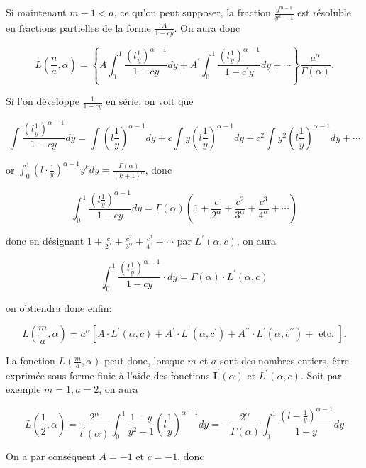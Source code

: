 \documentclass{article}
\begin{document}
Si maintenant \(m-1<a\), ce qu'on peut supposer, la fraction \(\frac{y^{m-1}}{y^{a}-1}\) est résoluble en fractions partielles de la forme \(\frac{A}{1-c y}\). On aura donc

\[
L\left(\frac{n}{a}, \alpha\right)=\left\{A \int_{0}^{1} \frac{\left(l \frac{1}{y}\right)^{\alpha-1}}{1-c y} d y+A^{\prime} \int_{0}^{1} \frac{\left(l \frac{1}{y}\right)^{\alpha-1}}{1-c^{\prime} y} d y+\cdots\right\} \frac{a^{\alpha}}{\Gamma(\alpha)} .
\]

Si l'on développe \(\frac{1}{1-c y}\) en série, on voit que

\[
\int \frac{\left(l \frac{1}{y}\right)^{\alpha-1}}{1-c y} d y=\int\left(l \frac{1}{y}\right)^{\alpha-1} d y+c \int y\left(l \frac{1}{y}\right)^{\alpha-1} d y+c^{2} \int y^{2}\left(l \frac{1}{y}\right)^{\alpha-1} d y+\cdots
\]

or \(\int_{0}^{1}\left(l \cdot \frac{1}{y}\right)^{\alpha-1} y^{k} d y=\frac{\Gamma(\alpha)}{(k+1)^{\alpha}}\), donc

\[
\int_{0}^{1} \frac{\left(l \frac{1}{y}\right)^{\alpha-1}}{1-c y} d y=\Gamma(\alpha)\left(1+\frac{c}{2^{\alpha}}+\frac{c^{2}}{3^{\alpha}}+\frac{c^{3}}{4^{\alpha}}+\cdots\right)
\]

donc en désignant \(1+\frac{c}{2^{\alpha}}+\frac{c^{2}}{3^{\alpha}}+\frac{c^{3}}{4^{\alpha}}+\cdots\) par \(L^{\prime}(\alpha, c)\), on aura

\[
\int_{0}^{1} \frac{\left(l \frac{1}{y}\right)^{\alpha-1}}{1-c y} \cdot d y=\Gamma(\alpha) \cdot L^{\prime}(\alpha, c)
\]

on obtiendra done enfin:

\[
L\left(\frac{m}{a}, \alpha\right)=a^{\alpha}\left[A \cdot L^{\prime}(\alpha, c)+A^{\prime} \cdot L^{\prime}\left(\alpha, c^{\prime}\right)+A^{\prime \prime} \cdot L^{\prime}\left(\alpha, c^{\prime \prime}\right)+\text { etc. }\right] .
\]

La fonction \(L\left(\frac{m}{a}, \alpha\right)\) peut done, lorsque \(m\) et \(a\) sont des nombres entiers, être exprimée sous forme finie à l'aide des fonctions \(\boldsymbol{I}^{\prime}(\alpha)\) et \(L^{\prime}(\alpha, c)\). Soit par exemple \(m=1, a=2\), on aura

\[
L\left(\frac{1}{2}, \alpha\right)=\frac{2^{\alpha}}{l^{\prime}(\alpha)} \int_{0}^{1} \frac{1-y}{y^{2}-1}\left(l \frac{1}{y}\right)^{\alpha-1} d y=-\frac{2^{\alpha}}{\Gamma(\alpha)} \int_{0}^{1} \frac{\left(l-\frac{1}{y}\right)^{\alpha-1}}{1+y} d y
\]

On a par conséquent \(A=-1\) et \(c=-1\), donc
\end{document}
